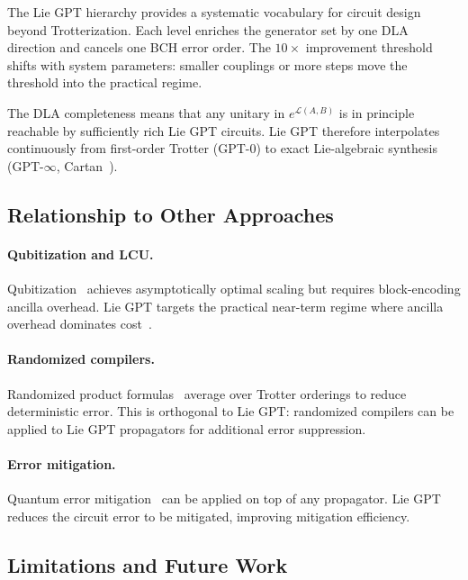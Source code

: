 \documentclass[aps,prxquantum,twocolumn,nofootinbib]{revtex4-2}
\begin{document}
The Lie GPT hierarchy provides a systematic vocabulary for circuit
design beyond Trotterization. Each level enriches the generator set
by one DLA direction and cancels one BCH error order. The
$10\times$ improvement threshold shifts with system parameters:
smaller couplings or more steps move the threshold into the
practical regime.

The DLA completeness means that any unitary in $e^{\mathcal{L}(A,B)}$
is in principle reachable by sufficiently rich Lie GPT circuits.
Lie GPT therefore interpolates continuously from first-order Trotter
(GPT-0) to exact Lie-algebraic synthesis (GPT-$\infty$,
Cartan~\cite{kokcu2022,steckmann2023,loschmidt2023prxq}).

\subsection{Relationship to Other Approaches}

\paragraph{Qubitization and LCU.}
Qubitization~\cite{childs2021,low2023pra,berry2024,babbush2022}
achieves asymptotically optimal scaling but requires block-encoding
ancilla overhead. Lie GPT targets the practical near-term regime where
ancilla overhead dominates cost~\cite{childs2022,haah2021}.

\paragraph{Randomized compilers.}
Randomized product formulas~\cite{campbell2022,chen2022a,miessen2023}
average over Trotter orderings to reduce deterministic error.
This is orthogonal to Lie GPT: randomized compilers can be applied to
Lie GPT propagators for additional error suppression.

\paragraph{Error mitigation.}
Quantum error mitigation~\cite{fontana2024prl,luo2022,nakaji2023}
can be applied on top of any propagator. Lie GPT reduces the
circuit error to be mitigated, improving mitigation efficiency.

\subsection{Limitations and Future Work}
\end{document}
